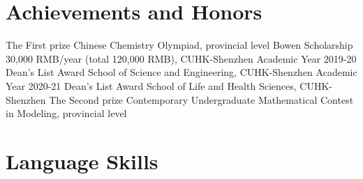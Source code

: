 \documentclass[12pt,a4paper,sans]{moderncv}
\newcommand{\cvsection}[1]{\section{{#1}}}
\begin{document}

\cvsection{Achievements and Honors}
{The First prize}{}
{Chinese Chemistry Olympiad, provincial level}{}
{}
{Bowen Scholarship}{}
{30,000 RMB/year (total 120,000 RMB), CUHK-Shenzhen}{}
{}
{Academic Year 2019-20 Dean's List Award}{}
{School of Science and Engineering, CUHK-Shenzhen}{}
{}
{Academic Year 2020-21 Dean's List Award}{}
{School of Life and Health Sciences, CUHK-Shenzhen}{}
{}
{The Second prize}{}
{Contemporary Undergraduate Mathematical Contest in Modeling, provincial level}{}
{}

\cvsection{Language Skills}


\end{document}
